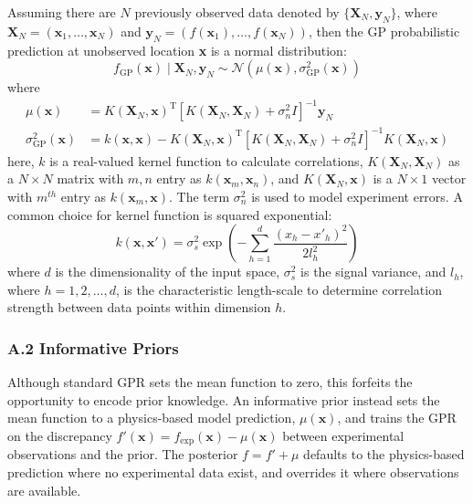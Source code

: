 Assuming there are $N$ previously observed data denoted by $\{\mathbf{X}_{N}, \mathbf{y}_{N}\}$, where $\mathbf{X}_{N} = (\mathbf{x}_{1}, \ldots, \mathbf{x}_{N})$ and $\mathbf{y}_{N} = \left(f(\mathbf{x}_{1}), \ldots, f(\mathbf{x}_{N})\right)$, then the GP probabilistic prediction at unobserved location \textbf{x} is a normal distribution:
\begin{equation}
\label{GP11}
f_{\textrm{GP}}(\mathbf{x}) \mid \mathbf{X}_{N}, \mathbf{y}_{N} \sim \mathcal{N}\left(\mu(\mathbf{x}),\sigma_{\textrm{GP}}^2(\mathbf{x})\right)
\end{equation}
where
\begin{equation}
\begin{aligned}
\label{meancov}
\mu(\mathbf{x}) &= K(\mathbf{X}_{N},\mathbf{x})^\textrm{T}[K(\mathbf{X}_{N},\mathbf{X}_{N})+\sigma^2_{n}I]^{-1} \mathbf{y}_{N}\\
\sigma_{\textrm{GP}}^2 (\mathbf{x})  &=  k(\mathbf{x},\mathbf{x}) - K(\mathbf{X}_{N},\mathbf{x})^\textrm{T} [K(\mathbf{X}_{N},\mathbf{X}_{N})+\sigma^2_{n}I]^{-1}K(\mathbf{X}_{N},\mathbf{x})
\end{aligned}
\end{equation}
here, $k$ is a real-valued kernel function to calculate correlations, $K(\mathbf{X}_{N},\mathbf{X}_{N})$ as a $N \times N$ matrix with $m,n$ entry as $k(\mathbf{x}_{m}, \mathbf{x}_{n})$, and $K(\mathbf{X}_{N}, \mathbf{x})$ is a $N \times 1$ vector with $m^{th}$ entry as $k(\mathbf{x}_{m}, \mathbf{x})$.  The term $\sigma^2_{n}$ is used to model experiment errors. A common choice for kernel function is squared exponential:
\begin{equation}
\label{eq:5}
k(\mathbf{x},\mathbf{x'}) = \sigma_s^2 \exp\left(- \sum_{h = 1}^{d} \frac {(x_h-x'_h)^2}{2l_h^2}\right )
\end{equation}
where $d$ is the dimensionality of the input space, $\sigma_s^2$ is the signal variance, and $l_h$, where $h = 1,2,\ldots,d$, is the characteristic length-scale to determine correlation strength between data points within dimension $h$.

\subsubsection*{A.2 Informative Priors}

Although standard GPR sets the mean function to zero, this forfeits the opportunity to encode prior knowledge. An informative prior instead sets the mean function to a physics-based model prediction, $\mu(\mathbf{x})$, and trains the GPR on the discrepancy $f'(\mathbf{x}) = f_{\textrm{exp}}(\mathbf{x}) - \mu(\mathbf{x})$ between experimental observations and the prior. The posterior $f = f' + \mu$ defaults to the physics-based prediction where no experimental data exist, and overrides it where observations are available.

